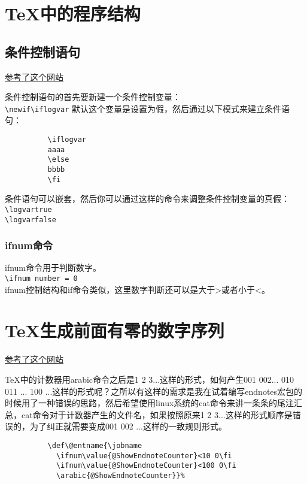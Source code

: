 \documentclass[11pt,oneside]{book}
\begin{document}
        \section{TeX中的程序结构}
        \subsection{条件控制语句}
        \label{sec:条件控制语句}
        \href{http://handyfloss.wordpress.com/2007/08/29/latex-programming-how-to-implement-conditionals/}{参考了这个网站}

        条件控制语句的首先要新建一个条件控制变量：\\
        \verb+\newif\iflogvar+
        默认这个变量是设置为假，然后通过以下模式来建立条件语句：
        \begin{Verbatim}
          \iflogvar
          aaaa
          \else
          bbbb
          \fi
        \end{Verbatim}
        条件语句可以嵌套，然后你可以通过这样的命令来调整条件控制变量的真假：\\
        \verb+\logvartrue+\\
        \verb+\logvarfalse+

        \subsubsection{ifnum命令}
        ifnum命令用于判断数字。\\
        \verb+\ifnum number = 0+\\
        ifnum控制结构和if命令类似，这里数字判断还可以是大于>或者小于<。

        \section{TeX生成前面有零的数字序列}
        \href{http://tex.stackexchange.com/questions/30930/how-to-output-a-counter-with-leading-zeros}{参考了这个网站}

        TeX中的计数器用arabic命令之后是1 2 3...这样的形式，如何产生001 002... 010 011 ... 100 ...这样的形式呢？之所以有这样的需求是我在试着编写endnotes宏包的时候用了一种错误的思路，然后希望使用linux系统的cat命令来讲一条条的尾注汇总，cat命令对于计数器产生的文件名，如果按照原来1 2 3...这样的形式顺序是错误的，为了纠正就需要变成001  002 ...这样的一致规则形式。

        \begin{Verbatim}
          \def\@entname{\jobname
            \ifnum\value{@ShowEndnoteCounter}<10 0\fi
            \ifnum\value{@ShowEndnoteCounter}<100 0\fi
            \arabic{@ShowEndnoteCounter}}%
        \end{Verbatim}
\end{document}
